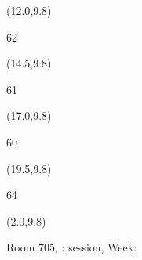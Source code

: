 \documentclass[a4paper]{article}
\newcommand{\myseat}[4]{%
\vspace{-0.1cm} \hspace{-0.5cm}
\parbox[t][2.2cm][t]{3.5cm}{%
\small #1 %
\begin{description}
\vspace{-0.1cm}
\item [ID:] #2
\vspace{-0.1cm}
\item [Team:] #3 \normalsize
\vspace{-0.1cm}
\item \normalsize #4
\vspace{-0.1cm}
\end{description}
}
}
\begin{document}
\begin{textblock}{2.5}(12.0,9.8)
\textblockcolor{}
\myseat{62}{}{}{}
\end{textblock}

\begin{textblock}{2.5}(14.5,9.8)
\textblockcolor{}
\myseat{61}{}{}{}
\end{textblock}

\begin{textblock}{2.5}(17.0,9.8)
\textblockcolor{}
\myseat{60}{}{}{}
\end{textblock}

\begin{textblock}{2.5}(19.5,9.8)
\textblockcolor{}
\myseat{64}{}{}{}
\end{textblock}

\begin{textblock}{10}(2.0,9.8)
\textblockcolor{}
\parbox[t][2.2cm][t]{9.5cm}{%
\large Room 705, :  session, Week: 
\vspace{-0.3cm} \hspace{-0.5cm}
}
\end{textblock}
\end{document}
